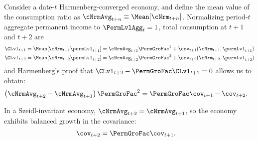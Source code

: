 \documentclass[BufferStockTheory]{subfiles}
\begin{document}
Consider a date-$t$ Harmenberg-converged economy, and define the mean value of the consumption ratio as $\cNrmAvg_{t+n} \equiv \Mean[\cNrm_{t+n}]$.
Normalizing period-$t$ aggregate permanent income to $\PermLvlAgg_{t}=1$, total consumption at $t+1$ and $t+2$ are
\begin{equation}\label{eq:atp2vsatp1}
  \begin{split}
    \CLvl_{t+1} & = \Mean[\cNrm_{t+1}\permLvl_{t+1}] = \cNrmAvg_{t+1}\PermGroFac^{1} + \cov_{t+1}(\cNrm_{t+1}, \permLvl_{t+1})
    \\  \CLvl_{t+2} & = \Mean[\cNrm_{t+2}\permLvl_{t+2}] = \cNrmAvg_{t+2}\PermGroFac^{2} + \cov_{t+2}(\cNrm_{t+2}, \permLvl_{t+2})
  \end{split}
\end{equation}
and Harmenberg's proof that $\CLvl_{t+2}-\PermGroFac \CLvl_{t+1}=0$ allows us to obtain:
\begin{equation} \label{eq:cNrmvsCov}\begin{split}
    \left(\cNrmAvg_{t+2} - \cNrmAvg_{t+1}\right)\PermGroFac^{2} & = \PermGroFac \cov_{t+1} - \cov_{t+2} .
  \end{split}\end{equation}

In a Szeidl-invariant economy, $\cNrmAvg_{t+2} = \cNrmAvg_{t+1}$, so the economy exhibits balanced growth in the covariance:
\begin{align}
  \cov_{t+2} & = \PermGroFac \cov_{t+1}.
\end{align}
\end{document}

